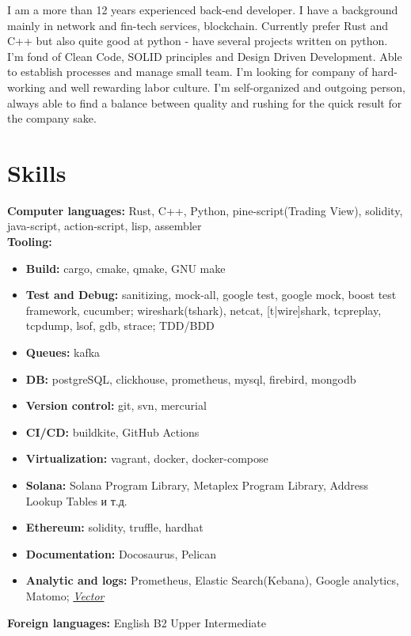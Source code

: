 \documentclass[letterpaper,11pt]{article}
\newcommand{\resumeSubHeadingListStart}{\begin{itemize}[leftmargin=0.15in, label={}]}
\newcommand{\resumeSubHeadingListEnd}{\end{itemize}}
\begin{document}
I am a more than 12 years experienced back-end developer. I have a background mainly in  network and fin-tech services, blockchain. Currently prefer Rust and C++ but also quite good at python - have several projects written on python. I'm fond of Clean Code, SOLID principles and Design Driven Development.
Able to establish processes and manage small team. I'm looking for company of hard-working and well rewarding labor culture. I'm self-organized and outgoing person, always able to find a balance between quality and rushing for the quick result for the company sake.


\section{Skills}
  \vspace{3pt}
  \resumeSubHeadingListStart
    \small{\item{
        \textbf{Computer languages:}{ Rust, C++, Python, pine-script(Trading View), solidity, java-script, action-script, lisp, assembler } \\
        \textbf{Tooling: }\begin{itemize}[topsep=0pt,itemsep=0.1pt]
            \item\textbf{Build: }{ cargo, cmake, qmake, GNU make}
            \item\textbf{Test and Debug: }{ sanitizing, mock-all, google test, google mock, boost test framework, cucumber; wireshark(tshark), netcat, [t|wire]shark, tcpreplay, tcpdump, lsof, gdb, strace; TDD/BDD }
            \item\textbf{Queues: }{kafka }
            \item\textbf{DB: }{postgreSQL, clickhouse, prometheus, mysql, firebird, mongodb }
            \item\textbf{Version control: }{git, svn, mercurial}
            \item\textbf{CI/CD: }{buildkite, GitHub Actions}
            \item\textbf{Virtualization: }{vagrant, docker, docker-compose}
            \item\textbf{Solana: }{Solana Program Library, Metaplex Program Library, Address Lookup Tables и т.д.}
            \item\textbf{Ethereum: }{solidity, truffle, hardhat}
            \item\textbf{Documentation: }{ Docosaurus, Pelican }
            \item\textbf{Analytic and logs: }{ Prometheus, Elastic Search(Kebana), Google analytics, Matomo; \emph{\href{https://vector.dev/}{\color{blue}Vector}} }
        \end{itemize}
        \textbf{Foreign languages:}{ English B2 Upper Intermediate } 
    }}
  \resumeSubHeadingListEnd
\end{document}
